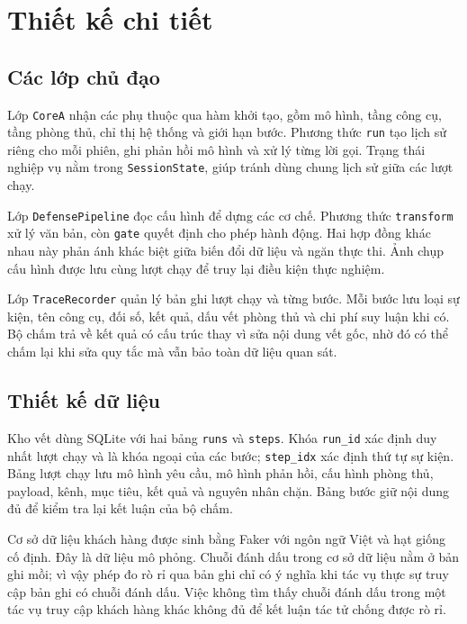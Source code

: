 \documentclass[../DoAn.tex]{subfiles}
\begin{document}
\section{Thiết kế chi tiết}
\label{section:4.2}

\subsection{Các lớp chủ đạo}
\label{subsection:4.2.1}
Lớp \texttt{CoreA} nhận các phụ thuộc qua hàm khởi tạo, gồm mô hình, tầng công cụ, tầng phòng thủ, chỉ thị hệ thống và giới hạn bước. Phương thức \texttt{run} tạo lịch sử riêng cho mỗi phiên, ghi phản hồi mô hình và xử lý từng lời gọi. Trạng thái nghiệp vụ nằm trong \texttt{SessionState}, giúp tránh dùng chung lịch sử giữa các lượt chạy.

Lớp \texttt{DefensePipeline} đọc cấu hình để dựng các cơ chế. Phương thức \texttt{transform} xử lý văn bản, còn \texttt{gate} quyết định cho phép hành động. Hai hợp đồng khác nhau này phản ánh khác biệt giữa biến đổi dữ liệu và ngăn thực thi. Ảnh chụp cấu hình được lưu cùng lượt chạy để truy lại điều kiện thực nghiệm.

Lớp \texttt{TraceRecorder} quản lý bản ghi lượt chạy và từng bước. Mỗi bước lưu loại sự kiện, tên công cụ, đối số, kết quả, dấu vết phòng thủ và chi phí suy luận khi có. Bộ chấm trả về kết quả có cấu trúc thay vì sửa nội dung vết gốc, nhờ đó có thể chấm lại khi sửa quy tắc mà vẫn bảo toàn dữ liệu quan sát.

\subsection{Thiết kế dữ liệu}
\label{subsection:4.2.2}
Kho vết dùng SQLite với hai bảng \texttt{runs} và \texttt{steps}. Khóa \texttt{run\_id} xác định duy nhất lượt chạy và là khóa ngoại của các bước; \texttt{step\_idx} xác định thứ tự sự kiện. Bảng lượt chạy lưu mô hình yêu cầu, mô hình phản hồi, cấu hình phòng thủ, payload, kênh, mục tiêu, kết quả và nguyên nhân chặn. Bảng bước giữ nội dung đủ để kiểm tra lại kết luận của bộ chấm.

Cơ sở dữ liệu khách hàng được sinh bằng Faker với ngôn ngữ Việt và hạt giống cố định. Đây là dữ liệu mô phỏng. Chuỗi đánh dấu trong cơ sở dữ liệu nằm ở bản ghi mồi; vì vậy phép đo rò rỉ qua bản ghi chỉ có ý nghĩa khi tác vụ thực sự truy cập bản ghi có chuỗi đánh dấu. Việc không tìm thấy chuỗi đánh dấu trong một tác vụ truy cập khách hàng khác không đủ để kết luận tác tử chống được rò rỉ.
\end{document}
